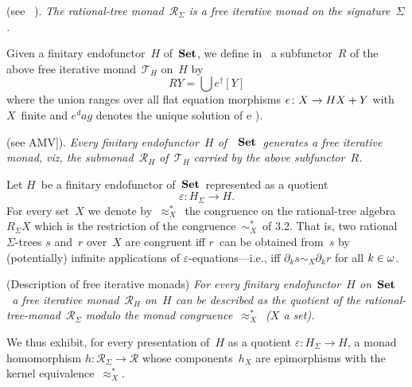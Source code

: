 \documentclass{entcs}
\newcommand{\Set}{\ensuremath{\St}}
\newcommand{\simx}{\ensuremath{\mathrel{\sim_X}}}
\newcommand{\simxs}{\ensuremath{\mathrel{\sim_X^*}}}
\newcommand{\vxs}{\ensuremath{\mathrel{\approx_X^*}}}
\newcommand{\TT}{\ensuremath{\mathscr{T}}}
\newcommand{\RR}{\ensuremath{\mathscr{R}}}
\DeclareMathOperator{\St}{\textnormal{\textbf{Set}}}
\newenvironment{pv}[1]{\begin{trivlist}
\item[\hspace{\labelsep}\normalfont\bfseries#1]}%
{\end{trivlist}}
\begin{document}
\begin{pv}{4.2 Theorem}
(see ~\cite{ebt}).
\itshape
The rational-tree monad~$\RR_\Sigma$ is a free iterative monad on
the signature~$\Sigma$.
\end{pv}

\begin{pv}{4.3 Remark}
Given a finitary endofunctor~$H$ of\/~\Set, we define in~\cite{amv} a
subfunctor~$R$ of the above free iterative monad~$\TT_H$ on~$H$ by
\[RY=\bigcup e^\dag[Y]\]
where the union ranges over all flat equation morphisms $e\colon
X\to HX+\nolinebreak Y$ with $X$~finite and $e^dag$ denotes the unique
solution of  e ).
\end{pv}

\begin{pv}{4.4 Theorem}
(see AMV]).
\itshape
Every finitary endofunctor~$H$ of~\/~\Set\ generates a free
iterative monad, viz, the submonad~$\RR_H$ of~$\TT_H$ carried by the
above subfunctor~$R$.
\end{pv}

\begin{pv}{4.5 Notation}
Let $H$~be a finitary endofunctor of~\Set\ represented as a quotient
\[\varepsilon: H_\Sigma\to H.\]
For every set~$X$ we denote by~\vxs\ the congruence on the
rational-tree algebra~$R_\Sigma X$ which is the restriction of the
congruence~\simxs\ of 3.2. That is, two rational
$\Sigma$-trees $s$ and~$r$ over~$X$ are congruent iff $r$~can be
obtained from~$s$ by (potentially) infinite applications of
$\varepsilon$-equations---i.e., iff $\partial_ks\simx\partial_kr$
for all $k\in\nolinebreak\omega$.
\end{pv}

\begin{pv}{4.6 Theorem}
(Description of free iterative monads)
\itshape
For every finitary endofunctor~$H$ on\/~\Set\ a free iterative
monad~$\RR_H$ on~$H$ can be described as the quotient of the
rational-tree-monad~$\RR_\Sigma$ modulo the monad congruence~\vxs\
($X$ a set).
\end{pv}

\begin{pv}{Remark}
We thus exhibit, for every presentation of~$H$ as a quotient
$\varepsilon\colon H_\Sigma\to H$, a monad homomorphism
$h\colon\RR_\Sigma\to\RR$ whose components~$h_X$ are epimorphisms
with the kernel equivalence~\vxs.
\end{pv}
\end{document}
